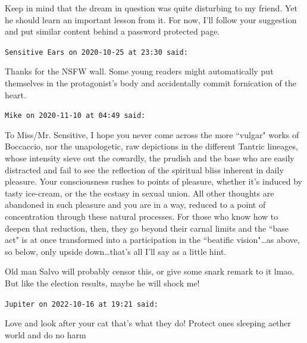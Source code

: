 \begin{footnotesize}
\begin{sffamily}
Keep in mind that the dream in question was quite disturbing to my friend. Yet he should learn an important lesson from
it. For now, I'll follow your suggestion and put similar content behind a password protected page.


\hfill

\texttt{Sensitive Ears on 2020-10-25 at 23:30 said: }

Thanks for the NSFW wall. Some young readers might automatically put themselves in the
protagonist's body and accidentally commit fornication of the heart.


\hfill

\texttt{Mike on 2020-11-10 at 04:49 said: }

To Miss/Mr. Sensitive, I hope you never come across the more ``vulgar" works of Boccaccio, nor the unapologetic, raw
depictions in the different Tantric lineages, whose intensity sieve out the cowardly, the prudish and the base who are
easily distracted and fail to see the reflection of the spiritual bliss inherent in daily pleasure. Your consciousness
rushes to points of pleasure, whether it's induced by tasty ice-cream, or the the ecstasy in
sexual union. All other thoughts are abandoned in such pleasure and you are in a way, reduced to a point of
concentration through these natural processes. For those who know how to deepen that reduction, then, they go beyond
their carnal limits and the ``base act" is at once transformed into a participation in the ``beatific vision"…as above,
so below, only upside down…that's all I'll say as a little hint.

Old man Salvo will probably censor this, or give some snark remark to it lmao. But like the election results, maybe he
will shock me!


\hfill

\texttt{Jupiter on 2022-10-16 at 19:21 said: }

Love and look after your cat that's what they do! Protect ones sleeping aether world and do no harm


\end{sffamily}\end{footnotesize}
